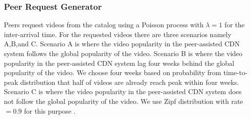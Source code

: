 \documentclass[10pt,final,journal,a4paper]{IEEEtran}
\begin{document}
\subsubsection{Peer Request Generator}\label{peerrequest}
Peers request videos from the catalog using a Poisson process with $\lambda=1$ \cite{Zink:2009:CYN:1502814.1502987} for the inter-arrival time.
For the requested videos there are three scenarios namely A,B,and C.
Scenario A is where the video popularity in the peer-assisted CDN system follows the global popularity of the video.
Scenario B is where the video popularity in the peer-assisted CDN system lag four weeks behind the global popularity of the video. 
We choose four weeks based on probability from time-to-peak distribution that half of videos are already reach peak within four weeks.
Scenario C is where the video popularity in the peer-assisted CDN system does not follow the global popularity of the video. 
We use Zipf distribution with rate$=0.9$ for this purpose \cite{6654887}.



\end{document}
